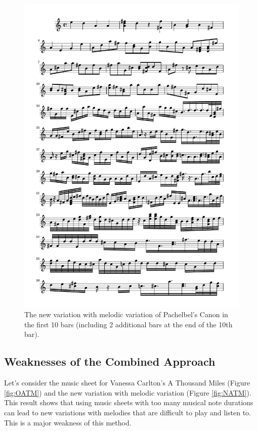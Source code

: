 \documentclass[11pt]{article}
\theoremstyle{definition}
\begin{document}
\begin{figure}
\centering
\includegraphics[trim=1cm 20.3cm 1cm 0.5cm, clip, scale=0.6]{New_CND.pdf}
\caption{The new variation with melodic variation of Pachelbel's Canon in the first 10 bars (including 2 additional bars at the end of the 10th bar).} 
\label{fig:NCND}
\end{figure}

\subsection{Weaknesses of the Combined Approach}

Let's consider the music sheet for Vanessa Carlton's A Thousand Miles (Figure \ref{fig:OATM}) and the new variation with melodic variation (Figure \ref{fig:NATM}). This result shows that using music sheets with too many musical note durations can lead to new variations with melodies that are difficult to play and listen to. This is a major weakness of this method.
\end{document}
